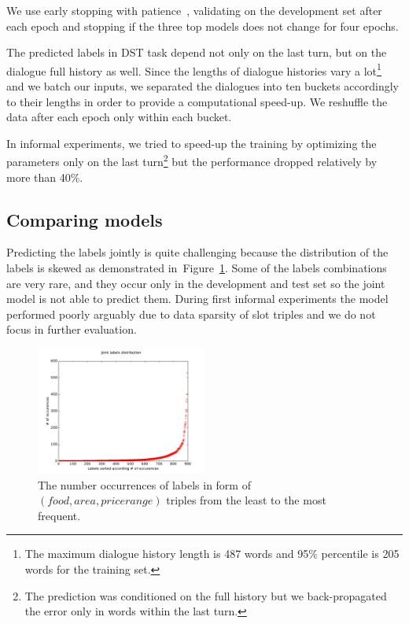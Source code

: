 \documentclass{itatnew}
\def\OD#1{{\color{darkgreen}OD: \it #1}}
\begin{document}
We use early stopping with patience~\cite{prechelt1998early}, validating on the development set after each epoch and stopping if the three top models does not change for four epochs.

The predicted labels in DST task depend not only on the last turn, but on the dialogue full history as well.
Since the lengths of dialogue histories vary a lot\footnote{The maximum dialogue history length is 487 words and 95\% percentile is 205 words for the training set.} and we batch our inputs, we separated the dialogues into ten buckets accordingly to their lengths in order to provide a computational speed-up. We reshuffle the data after each epoch only within each bucket.

In informal experiments, we tried to speed-up the training by  optimizing the parameters only on the last turn\footnote{The prediction was conditioned on the full history but we back-propagated the error only in words within the last turn.} but the performance dropped relatively by more than 40\%.

\subsection{Comparing models}
\label{sec:eval}

Predicting the labels jointly is quite challenging because the distribution of the labels is skewed as demonstrated in~Figure~\ref{fig:labels}.
Some of the labels combinations are very rare, and they occur only in the development and test set so the joint model is not able to predict them.
During first informal experiments the model performed poorly arguably due to data sparsity of slot triples and we do not focus in further evaluation.

\begin{figure}
\includegraphics[width=0.5\textwidth]{jointLabelsDistrib}
\caption{The number occurrences of labels in form of $(food, area, pricerange)$ triples from the least to the most frequent.}
\label{fig:labels}
\end{figure}
\end{document}
